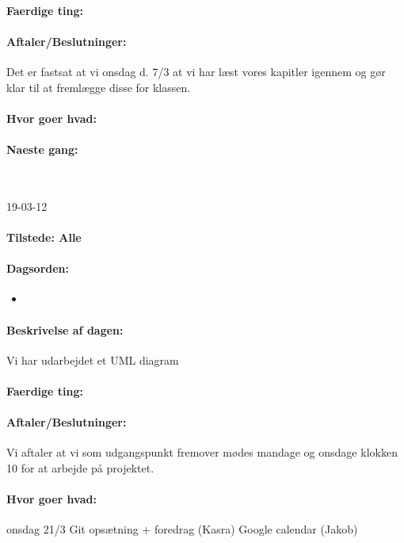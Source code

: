 \documentclass[a4paper,10pt,titlepage]{article}
\begin{document}
		\paragraph{Faerdige ting:}
		
		\paragraph{Aftaler/Beslutninger:}
		Det er fastsat at vi onsdag d. 7/3 at vi har læst vores kapitler igennem og gør klar til at fremlægge disse for klassen.
		\paragraph{Hvor goer hvad:}
		
		\paragraph{Naeste gang:}\mbox{}\\
		
		\begin{center}
		19-03-12
		\end{center}
		
		\paragraph{Tilstede: Alle}
		\paragraph{Dagsorden:}
		\begin{itemize}
					\item 
		\end{itemize}
		
		\paragraph{Beskrivelse af dagen:}
		Vi har udarbejdet et UML diagram
		\paragraph{Faerdige ting:}
		
		\paragraph{Aftaler/Beslutninger:}
		Vi aftaler at vi som udgangspunkt fremover mødes mandage og onsdage klokken 10 for at arbejde på projektet.
		\paragraph{Hvor goer hvad:}
		onsdag 21/3
Git opsætning + foredrag (Kasra)
Google calendar (Jakob)
\end{document}
